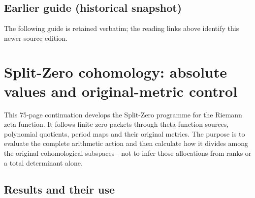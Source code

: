 \documentclass[
]{article}
\begin{document}
\subsection{Earlier guide (historical
snapshot)}\label{earlier-guide-historical-snapshot}

The following guide is retained verbatim; the reading links above
identify this newer source edition.

\section{Split-Zero cohomology: absolute values and original-metric
control}\label{split-zero-cohomology-absolute-values-and-original-metric-control}

This 75-page continuation develops the Split-Zero programme for the
Riemann zeta function. It follows finite zero packets through
theta-function sources, polynomial quotients, period maps and their
original metrics. The purpose is to evaluate the complete arithmetic
action and then calculate how it divides among the original
cohomological subspaces---not to infer those allocations from ranks or a
total determinant alone.

\subsection{Results and their use}\label{results-and-their-use}
\end{document}
